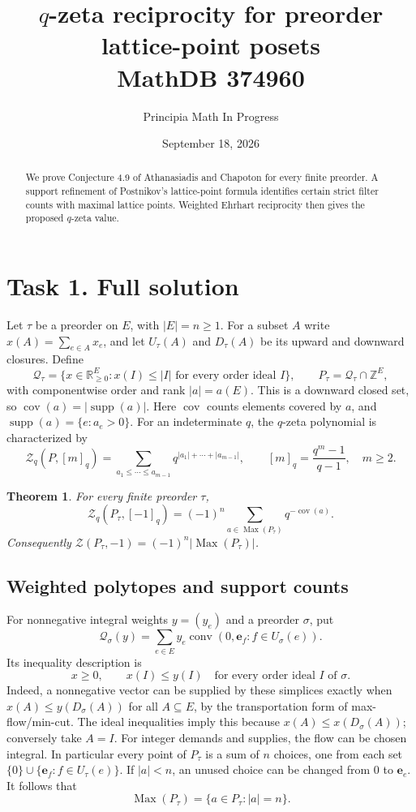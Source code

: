 \documentclass[11pt]{article}
\title{$q$-zeta reciprocity for preorder lattice-point posets\\\large MathDB 374960}
\author{Principia Math In Progress}
\date{September 18, 2026}
\newtheorem{theorem}{Theorem}
\newcommand{\Q}{\mathcal Q}
\newcommand{\supp}{\operatorname{supp}}
\newcommand{\Max}{\operatorname{Max}}
\newcommand{\cov}{\operatorname{cov}}
\newcommand{\Z}{\mathbb Z}
\begin{document}
\maketitle
\begin{abstract}
We prove Conjecture 4.9 of Athanasiadis and Chapoton for every finite
preorder. A support refinement of Postnikov's lattice-point formula
identifies certain strict filter counts with maximal lattice points.
Weighted Ehrhart reciprocity then gives the proposed $q$-zeta value.
\end{abstract}

\section*{Task 1. Full solution}
Let $\tau$ be a preorder on $E$, with $|E|=n\ge1$. For a subset $A$
write $x(A)=\sum_{e\in A}x_e$, and let $U_\tau(A)$ and $D_\tau(A)$
be its upward and downward closures. Define
\[
 \Q_\tau=\{x\in\mathbb R_{\ge0}^E:x(I)\le |I|
                  \text{ for every order ideal }I\},\qquad
 P_\tau=\Q_\tau\cap\Z^E,
\]
with componentwise order and rank $|a|=a(E)$. This is a downward
closed set, so $\cov(a)=|\supp(a)|$. Here $\cov$ counts elements
covered by $a$, and $\supp(a)=\{e:a_e>0\}$.
For an indeterminate $q$, the $q$-zeta polynomial is characterized by
\[
 \mathcal Z_q(P,[m]_q)=
 \sum_{a_1\le\cdots\le a_{m-1}}q^{|a_1|+\cdots+|a_{m-1}|},
 \qquad [m]_q=\frac{q^m-1}{q-1},\quad m\ge2.
\]

\begin{theorem}\label{thm:main}
For every finite preorder $\tau$,
\[
 \boxed{\mathcal Z_q(P_\tau,[-1]_q)
   =(-1)^n\sum_{a\in\Max(P_\tau)}q^{-\cov(a)}.}
\]
Consequently $\mathcal Z(P_\tau,-1)=(-1)^n|\Max(P_\tau)|$.
\end{theorem}

\subsection*{Weighted polytopes and support counts}
For nonnegative integral weights $y=(y_e)$ and a preorder $\sigma$, put
\[
 \Q_\sigma(y)=\sum_{e\in E}y_e
        \operatorname{conv}(0,\mathbf e_f:f\in U_\sigma(e)).
\]
Its inequality description is
\begin{equation}\label{eq:weighted}
 x\ge0,\qquad x(I)\le y(I)\quad
                 \text{for every order ideal $I$ of $\sigma$}.
\end{equation}
Indeed, a nonnegative vector can be supplied by these simplices
exactly when $x(A)\le y(D_\sigma(A))$ for all $A\subseteq E$,
by the transportation form of max-flow/min-cut. The ideal inequalities
imply this because $x(A)\le x(D_\sigma(A))$; conversely take $A=I$.
For integer demands and supplies, the flow can be chosen integral.
In particular every point of $P_\tau$ is a sum of $n$ choices,
one from each set $\{0\}\cup\{\mathbf e_f:f\in U_\tau(e)\}$.
If $|a|<n$, an unused choice can be changed from $0$ to $\mathbf e_e$.
It follows that
\begin{equation}\label{eq:max}
 \Max(P_\tau)=\{a\in P_\tau:|a|=n\}.
\end{equation}
\end{document}
